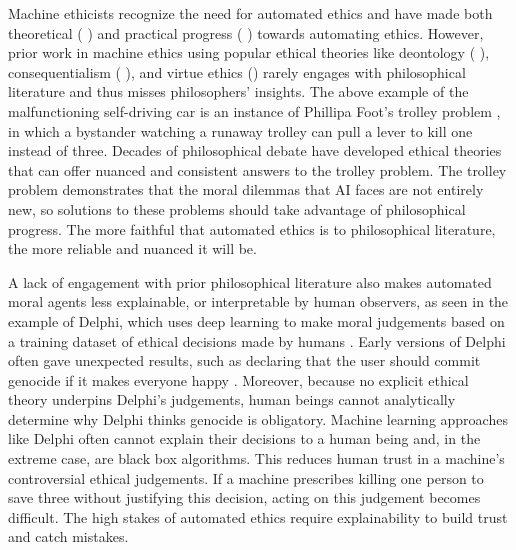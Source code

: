\begin{isabellebody}
\begin{isamarkuptext}
Machine ethicists recognize the need for automated ethics and have made both theoretical 
(\citep{moralmachineonline} \citep{davenport} \citep{moralmachine} \citep{gabriel}) and practical progress 
(\citep{logicprogramming} \citep{biology} \citep{delphi} \citep{winfield}) towards automating ethics. 
However, prior work in machine ethics using popular ethical theories like deontology (\citep{deon2} \citep{deon1}), 
consequentialism (\citep{util1} \citep{util2} \citep{cloos}), and virtue ethics (\citep{berberich}) rarely 
engages with philosophical literature and thus misses philosophers' insights. The above example of 
the malfunctioning self-driving car is an instance of Phillipa Foot's trolley problem \citep{foot}, 
in which a bystander watching a runaway trolley can pull a lever to kill one instead of three. 
Decades of philosophical debate have developed ethical theories that can offer nuanced and 
consistent answers to the trolley problem. The trolley problem demonstrates that the moral dilemmas 
that AI faces are not entirely new, so solutions to these problems should take advantage of philosophical 
progress. The more faithful that automated ethics is to philosophical literature, the more reliable and 
nuanced it will be.

A lack of engagement with prior philosophical literature also makes automated moral agents less 
explainable, or interpretable by human observers, as seen in the example of Delphi, which uses deep 
learning to make moral judgements based on a training dataset of ethical decisions made by humans \citep{delphi}. 
Early versions of Delphi often gave unexpected results, such as declaring that the user should commit 
genocide if it makes everyone happy \citep{verge}. Moreover, because no explicit ethical theory underpins 
Delphi's judgements, human beings cannot analytically determine why Delphi thinks genocide is obligatory. 
Machine learning approaches like Delphi often cannot explain their decisions to a human being and, 
in the extreme case, are black box algorithms. This reduces human trust in a machine's controversial 
ethical judgements. If a machine prescribes killing one person to save three without justifying this 
decision, acting on this judgement becomes difficult. The high stakes of automated ethics require 
explainability to build trust and catch mistakes. 


\end{isamarkuptext}
\end{isabellebody}

